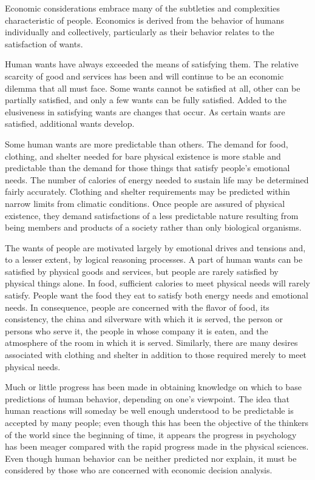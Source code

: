 Economic considerations embrace many of the subtleties and complexities characteristic of people. Economics is derived from the behavior of humans individually and collectively, particularly as their behavior relates to the satisfaction of wants.

Human wants have always exceeded the means of satisfying them. The relative scarcity of good and services has been and will continue to be an economic dilemma that all must face. Some wants cannot be satisfied at all, other can be partially satisfied, and only a few wants can be fully satisfied. Added to the elusiveness in satisfying wants are changes that occur.  As certain wants are satisfied, additional wants develop.

Some human wants are more predictable than others. The demand for food, clothing, and shelter needed for bare physical existence is more stable and predictable than the demand for those things that satisfy people’s emotional needs. The number of calories of energy needed to sustain life may be determined fairly accurately. Clothing and shelter requirements may be predicted within narrow limits from climatic conditions. Once people are assured of physical existence, they demand satisfactions of a less predictable nature resulting from being members and products of a society rather than only biological organisms.

The wants of people are motivated largely by emotional drives and tensions and, to a lesser extent, by logical reasoning processes. A part of human wants can be satisfied by physical goods and services, but people are rarely satisfied by physical things alone. In food, sufficient calories to meet physical needs will rarely satisfy. People want the food they eat to satisfy both energy needs and emotional needs. In consequence, people are concerned with the flavor of food, its consistency, the china and silverware with which it is served, the person or persons who serve it, the people in whose company it is eaten, and the atmosphere of the room in which it is served. Similarly, there are many desires associated with clothing and shelter in addition to those required merely to meet physical needs.

Much or little progress has been made in obtaining knowledge on which to base predictions of human behavior, depending on one’s viewpoint. The idea that human reactions will someday be well enough understood to be predictable is accepted by many people; even though this has been the objective of the thinkers of the world since the beginning of time, it appears the progress in psychology has been meager compared with the rapid progress made in the physical sciences. Even though human behavior can be neither predicted nor explain, it must be considered by those who are concerned with economic decision analysis.

